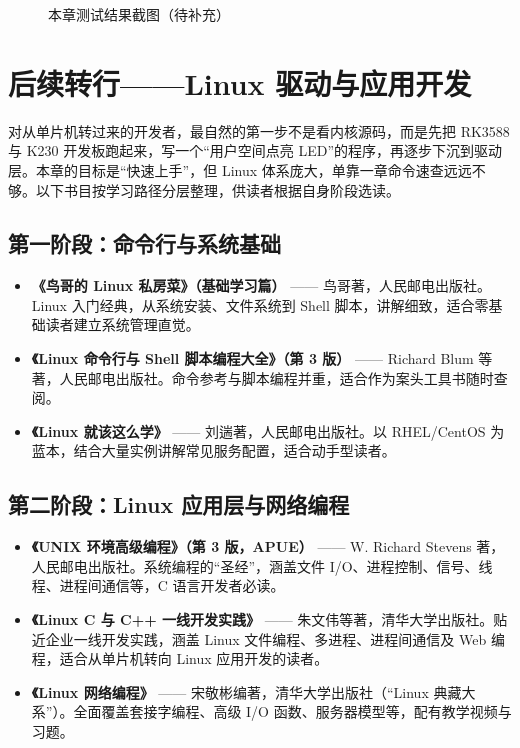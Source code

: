 \begin{figure}[htbp]
\centering
\caption{本章测试结果截图（待补充）} \label{fig:linux-test-result}
\end{figure}
\section{后续转行——Linux 驱动与应用开发}

对从单片机转过来的开发者，最自然的第一步不是看内核源码，而是先把 RK3588 与 K230 开发板跑起来，写一个“用户空间点亮 LED”的程序，再逐步下沉到驱动层。本章的目标是“快速上手”，但 Linux 体系庞大，单靠一章命令速查远远不够。以下书目按学习路径分层整理，供读者根据自身阶段选读。

\subsection*{第一阶段：命令行与系统基础}
\begin{itemize}
	\item \textbf{《鸟哥的 Linux 私房菜》（基础学习篇）} —— 鸟哥著，人民邮电出版社。Linux 入门经典，从系统安装、文件系统到 Shell 脚本，讲解细致，适合零基础读者建立系统管理直觉。
	\item \textbf{《Linux 命令行与 Shell 脚本编程大全》（第 3 版）} —— Richard Blum 等著，人民邮电出版社。命令参考与脚本编程并重，适合作为案头工具书随时查阅。
	\item \textbf{《Linux 就该这么学》} —— 刘遄著，人民邮电出版社。以 RHEL/CentOS 为蓝本，结合大量实例讲解常见服务配置，适合动手型读者。
\end{itemize}

\subsection*{第二阶段：Linux 应用层与网络编程}
\begin{itemize}
	\item \textbf{《UNIX 环境高级编程》（第 3 版，APUE）} —— W. Richard Stevens 著，人民邮电出版社。系统编程的“圣经”，涵盖文件 I/O、进程控制、信号、线程、进程间通信等，C 语言开发者必读。
	\item \textbf{《Linux C 与 C++ 一线开发实践》} —— 朱文伟等著，清华大学出版社。贴近企业一线开发实践，涵盖 Linux 文件编程、多进程、进程间通信及 Web 编程，适合从单片机转向 Linux 应用开发的读者。
	\item \textbf{《Linux 网络编程》} —— 宋敬彬编著，清华大学出版社（“Linux 典藏大系”）。全面覆盖套接字编程、高级 I/O 函数、服务器模型等，配有教学视频与习题。
\end{itemize}

